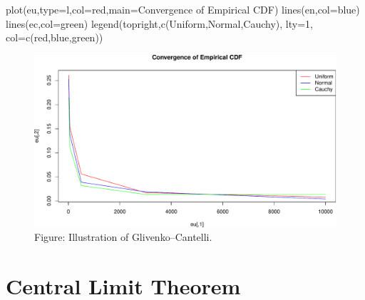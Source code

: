 \documentclass[
  letterpaper,
  DIV=11,
  numbers=noendperiod]{scrreprt}
\newenvironment{Shaded}{\begin{snugshade}}{\end{snugshade}}
\newcommand{\AttributeTok}[1]{\textcolor[rgb]{0.40,0.45,0.13}{#1}}
\newcommand{\DecValTok}[1]{\textcolor[rgb]{0.68,0.00,0.00}{#1}}
\newcommand{\FunctionTok}[1]{\textcolor[rgb]{0.28,0.35,0.67}{#1}}
\newcommand{\NormalTok}[1]{\textcolor[rgb]{0.00,0.23,0.31}{#1}}
\newcommand{\StringTok}[1]{\textcolor[rgb]{0.13,0.47,0.30}{#1}}
\theoremstyle{definition}
\theoremstyle{plain}
\theoremstyle{plain}
\theoremstyle{definition}
\theoremstyle{plain}
\theoremstyle{definition}
\theoremstyle{remark}
\begin{document}
\begin{Shaded}
\begin{Highlighting}[]
\FunctionTok{plot}\NormalTok{(eu,}\AttributeTok{type=}\StringTok{\textquotesingle{}l\textquotesingle{}}\NormalTok{,}\AttributeTok{col=}\StringTok{\textquotesingle{}red\textquotesingle{}}\NormalTok{,}\AttributeTok{main=}\StringTok{\textquotesingle{}Convergence of Empirical CDF\textquotesingle{}}\NormalTok{)}
\FunctionTok{lines}\NormalTok{(en,}\AttributeTok{col=}\StringTok{\textquotesingle{}blue\textquotesingle{}}\NormalTok{)}
\FunctionTok{lines}\NormalTok{(ec,}\AttributeTok{col=}\StringTok{\textquotesingle{}green\textquotesingle{}}\NormalTok{)}
\FunctionTok{legend}\NormalTok{(}\StringTok{\textquotesingle{}topright\textquotesingle{}}\NormalTok{,}\FunctionTok{c}\NormalTok{(}\StringTok{\textquotesingle{}Uniform\textquotesingle{}}\NormalTok{,}\StringTok{\textquotesingle{}Normal\textquotesingle{}}\NormalTok{,}\StringTok{\textquotesingle{}Cauchy\textquotesingle{}}\NormalTok{), }\AttributeTok{lty=}\DecValTok{1}\NormalTok{, }\AttributeTok{col=}\FunctionTok{c}\NormalTok{(}\StringTok{\textquotesingle{}red\textquotesingle{}}\NormalTok{,}\StringTok{\textquotesingle{}blue\textquotesingle{}}\NormalTok{,}\StringTok{\textquotesingle{}green\textquotesingle{}}\NormalTok{))}
\end{Highlighting}
\end{Shaded}

\begin{figure}[H]

{\centering \includegraphics[width=0.7\linewidth,height=\textheight,keepaspectratio]{lln_files/figure-pdf/unnamed-chunk-1-1.pdf}

}

\caption{Figure: Illustration of Glivenko--Cantelli.}

\end{figure}%

\chapter{Central Limit Theorem}\label{sec-clt}
\end{document}
